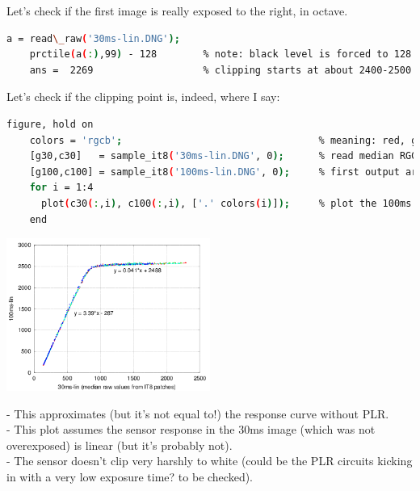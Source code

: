 {Let's check if the first image is really exposed to the right, in octave.  

\begin{lstlisting}[language=bash,morekeywords=$,keywordstyle=\bfseries,frame=none,xleftmargin=.25in,belowskip=2em, aboveskip=2em]
    a = read\_raw('30ms-lin.DNG');
    prctile(a(:),99) - 128        % note: black level is forced to 128 in raw2dng
    ans =  2269                   % clipping starts at about 2400-2500 above black
\end{lstlisting}

Let's check if the clipping point is, indeed, where I say: 

\begin{lstlisting}[language=bash,morekeywords=$,keywordstyle=\bfseries,frame=none,xleftmargin=.25in,belowskip=2em, aboveskip=2em]
    figure, hold on
    colors = 'rgcb';                                  % meaning: red, gren1, green2 (plotted as cyan), blue (raw data from Bayer channels)
    [g30,c30]   = sample_it8('30ms-lin.DNG', 0);      % read median RGGB swatch values from IT8 chart
    [g100,c100] = sample_it8('100ms-lin.DNG', 0);     % first output arg is grayscale, second is full color, each column is a Bayer channel
    for i = 1:4
      plot(c30(:,i), c100(:,i), ['.' colors(i)]);     % plot the 100ms image vs the 30ms one (extremely rough guess for response curve)
    end
\end{lstlisting}

\begin{center}
\includegraphics[height=5cm]{images/100ms-vs-30ms-lin}
\end{center}

- This approximates (but it's not equal to!) the response curve without PLR.\\
- This plot assumes the sensor response in the 30ms image (which was not overexposed) is linear (but it's probably not).\\
- The sensor doesn't clip very harshly to white (could be the PLR circuits kicking in with a very low exposure time? to be checked).\\

}
